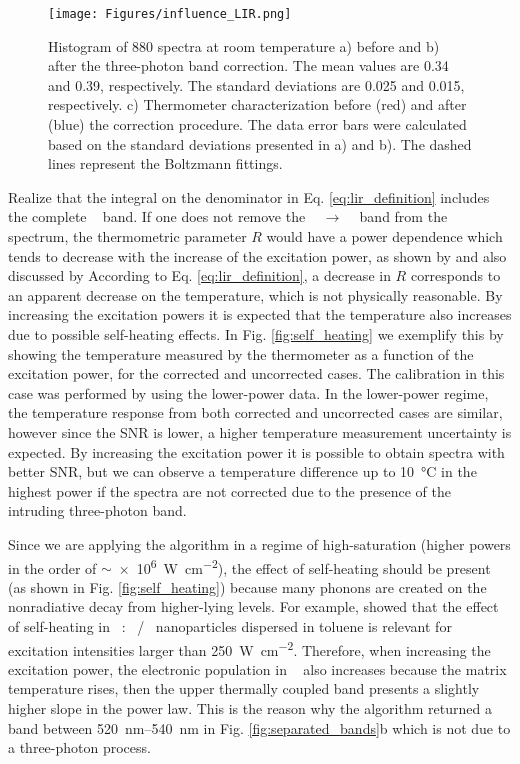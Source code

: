 \documentclass[journal=jacsat,manuscript=article, layout=twocolumn]{achemso}
\newcommand*\Fluorite[1]{NaYF$_{4}$}
\newcommand*\Yb[1]{Yb$^{3+}$}
\newcommand*\Er[1]{Er$^{3+}$}
\newcommand*\twoHnine[1]{$^2$H$_{9/2}$}
\newcommand*\twoHeleven[1]{$^2$H$_{11/2}$}
\newcommand*\fourSthree[1]{$^4$S$_{3/2}$}
\newcommand*\fourIthirteen[1]{$^4$I$_{13/2}$}
\begin{document}
\begin{figure}[h]
\begin{center}
\texttt{[image: Figures/influence\_LIR.png]}
\caption{Histogram of 880 spectra at room temperature a) before and b) after the three-photon band correction. The mean values are 0.34 and 0.39, respectively. The standard deviations are 0.025 and 0.015, respectively. c) Thermometer characterization before (red) and after (blue) the correction procedure. The data error bars were calculated based on the standard deviations presented in a) and b). The dashed lines represent the Boltzmann fittings.}%
\label{fig:LIR_result}
\end{center}
\end{figure}

Realize that the integral on the denominator in Eq. \eqref{eq:lir_definition} includes the complete \fourSthree~ band. If one does not remove the \twoHnine~ $\rightarrow$ \fourIthirteen~ band from the spectrum, the thermometric parameter $R$ would have a power dependence which tends to decrease with the increase of the excitation power, as shown by \citeauthor{Ruhl_2021} \cite{Ruhl_2021} and also discussed by \citeauthor{Pessoa_2022} \cite{Pessoa_2022} According to Eq. \eqref{eq:lir_definition}, a decrease in $R$ corresponds to an apparent decrease on the temperature, which is not physically reasonable. By increasing the excitation powers it is expected that the temperature also increases due to possible self-heating effects. In Fig. \ref{fig:self_heating} we exemplify this by showing the temperature measured by the thermometer as a function of the excitation power, for the corrected and uncorrected cases. The calibration in this case was performed by using the lower-power data. In the lower-power regime, the temperature response from both corrected and uncorrected cases are similar, however since the SNR is lower, a higher temperature measurement uncertainty is expected. By increasing the excitation power it is possible to obtain spectra with better SNR, but we can observe a temperature difference up to \SI{10}{\celsius} in the highest power if the spectra are not corrected due to the presence of the intruding three-photon band.

Since we are applying the algorithm in a regime of high-saturation (higher powers in the order of $\sim$\SI{e6}{\watt\per\square\centi\meter}), the effect of self-heating should be present (as shown in Fig. \ref{fig:self_heating}) because many phonons are created on the nonradiative decay from higher-lying levels. For example, \citeauthor{Joseph_2018} \cite{Joseph_2018} showed that the effect of self-heating in \Fluorite~: \Yb~/\Er~ nanoparticles dispersed in toluene is relevant for excitation intensities larger than \SI{250}{\watt\per\square\centi\meter}. Therefore, when increasing the excitation power, the electronic population in \twoHeleven~ also increases because the matrix temperature rises, then the upper thermally coupled band presents a slightly higher slope in the power law. This is the reason why the algorithm returned a band between \SIrange{520}{540}{\nano\meter} in Fig. \ref{fig:separated_bands}b which is not due to a three-photon process. 
\end{document}

